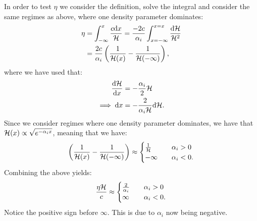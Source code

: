     In order to test $\eta$ we consider the definition, solve the integral and consider the same regimes as above, where one density parameter dominates:
    \begin{equation}
        \begin{split}
            \eta &= \int_{-\infty}^x \frac{c\mathrm{d} x}{\mathcal{H}} = \frac{-2c}{\alpha_i}\int_{x=-\infty}^{x=x}\frac{\mathrm{d}\mathcal{H}}{\mathcal{H}^2} \\
            &= \frac{2c}{\alpha_i}\left(\frac{1}{\mathcal{H}(x)}-\frac{1}{\mathcal{H}(-\infty)}\right),
        \end{split}
    \end{equation}
    where we have used that:
    \begin{equation}
        \begin{split}
            \dv{\mathcal{H}}{x} &= -\frac{\alpha_i}{2}\mathcal{H} \\
            \implies \mathrm{d} x &= -\frac{2}{\alpha_i\mathcal{H}}\mathrm{d}\mathcal{H}.
        \end{split}
    \end{equation}
    Since we consider regimes where one density parameter dominates, we have that $\mathcal{H}(x)\propto \sqrt{e^{-\alpha_ix}}$, meaning that we have:
    \begin{equation}
        \left(\frac{1}{\mathcal{H}(x)}-\frac{1}{\mathcal{H}(-\infty)}\right) \approx 
        \begin{cases}
            \frac{1}{\mathcal{H}} \quad &\alpha_i>0 \\
            -\infty \quad &\alpha_i <0.
        \end{cases}
    \end{equation}
    Combining the above yields:
    \begin{equation}
        \frac{\eta\mathcal{H}}{c} \approx 
        \begin{cases}
            \frac{2}{\alpha_i} \quad &\alpha_i>0 \\
            \infty \quad &\alpha_i<0.
        \end{cases}
    \end{equation}
    Notice the positive sign before $\infty$. This is due to $\alpha_i$ now being negative. 
    
